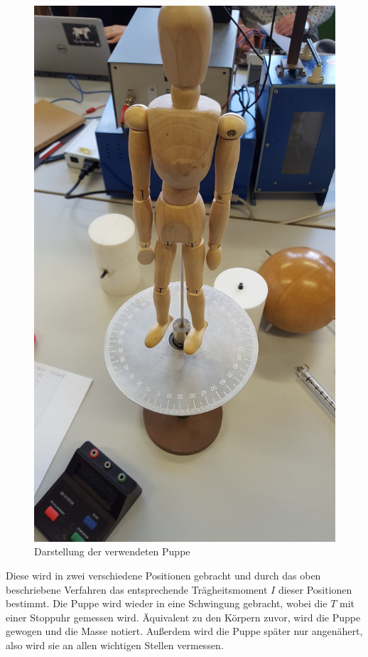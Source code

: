 \begin{figure}
    \centering
    \includegraphics[width=\textwidth/2]{images/foto_7.jpg}
    \caption{Darstellung der verwendeten Puppe \cite{V101}}
    \label{fig:puppe}
\end{figure}

Diese wird in zwei verschiedene Positionen gebracht und durch das oben beschriebene Verfahren das entsprechende Trägheitsmoment $I$ dieser Positionen bestimmt. 
Die Puppe wird wieder in eine Schwingung gebracht, wobei die $T$ mit einer Stoppuhr gemessen wird.
Äquivalent zu den Körpern zuvor, wird die Puppe gewogen und die Masse notiert. Außerdem wird die Puppe später nur angenähert, also wird sie an allen wichtigen Stellen vermessen.